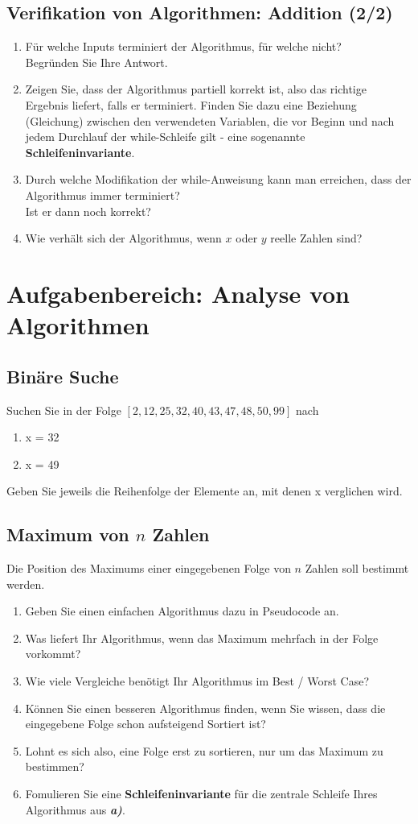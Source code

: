 \documentclass{article}
\begin{document}
\subsection{Verifikation von Algorithmen: Addition (2/2)}
\begin{enumerate}[label=\alph*)] 
    \item Für welche Inputs terminiert der Algorithmus, für welche nicht? \\Begründen Sie Ihre Antwort.
    \item Zeigen Sie, dass der Algorithmus partiell korrekt ist, also das richtige Ergebnis liefert, falls er terminiert. Finden Sie dazu eine Beziehung (Gleichung) zwischen den verwendeten Variablen, die vor Beginn und nach jedem Durchlauf der while-Schleife gilt - eine sogenannte \textbf{Schleifeninvariante}.
    \item Durch welche Modifikation der while-Anweisung kann man erreichen, dass der Algorithmus immer terminiert? \\Ist er dann noch korrekt?
    \item Wie verhält sich der Algorithmus, wenn $x$ oder $y$ reelle Zahlen sind?
\end{enumerate}

\newpage
\section{Aufgabenbereich: Analyse von Algorithmen}
\subsection{Binäre Suche}
Suchen Sie in der Folge $[2,12,25,32,40,43,47,48,50,99]$ nach
\begin{enumerate}[label=\alph*)]
    \item x = 32
    \item x = 49
\end{enumerate}
Geben Sie jeweils die Reihenfolge der Elemente an, mit denen x verglichen wird.
\subsection{Maximum von $n$ Zahlen}
Die Position des Maximums einer eingegebenen Folge von $n$ Zahlen soll bestimmt werden.
\begin{enumerate}[label=\alph*)]
    \item Geben Sie einen einfachen Algorithmus dazu in Pseudocode an.
    \item Was liefert Ihr Algorithmus, wenn das Maximum mehrfach in der Folge vorkommt?
    \item Wie viele Vergleiche benötigt Ihr Algorithmus im Best / Worst Case?
    \item Können Sie einen besseren Algorithmus finden, wenn Sie wissen, dass die eingegebene Folge schon aufsteigend Sortiert ist?
    \item Lohnt es sich also, eine Folge erst zu sortieren, nur um das Maximum zu bestimmen?
    \item Fomulieren Sie eine \textbf{Schleifeninvariante} für die zentrale Schleife Ihres Algorithmus aus \textit{\textbf{a)}}.
\end{enumerate}
\newpage
\end{document}

